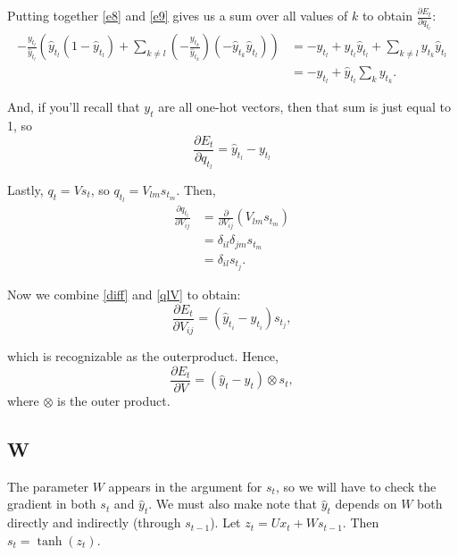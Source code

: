 \documentclass[11pt,twoside]{article}
\begin{document}
\noindent Putting together \eqref{e8} and \eqref{e9} gives us a sum over all values of $k$ to obtain $\frac{\partial E_t}{\partial q_{t_l}}$:
\begin{subequations}
\begin{align}
-\frac{y_{t_l}}{\hat{y}_{t_l}}\left(\hat{y}_{t_l}\left(1-\hat{y}_{t_l}\right)+\sum_{k\ne l}{}\left(-\frac{y_{t_k}}{\hat{y}_{t_k}}\right)\left(-\hat{y}_{t_k}\hat{y}_{t_l}\right)  \right)
&= -y_{t_l}+y_{t_l}\hat{y}_{t_l}+\sum_{k\ne l}{}y_{t_k}\hat{y}_{t_l} \\
&= -y_{t_l} + \hat{y}_{t_l}\sum_{k}{}y_{t_k}.
\end{align}
\end{subequations}

\noindent And, if you'll recall that $y_t$ are all one-hot vectors, then that sum is just equal to 1, so
\begin{equation}
\label{diff}
\frac{\partial E_t}{\partial q_{t_l}}=\hat{y}_{t_l}-y_{t_l}
\end{equation}


\noindent Lastly, $q_t=V s_t$, so $q_{t_l}=V_{l m}s_{t_m}$. Then,
\begin{subequations}
\begin{align}
\frac{\partial q_{t_l}}{\partial V_{i j}} &= \frac{\partial }{\partial V_{i j}}\left(V_{l m} s_{t_m}\right) \\
	&= \delta_{i l}\delta_{j m}s_{t_m} \\
\label{qlV}
	&= \delta_{i l}s_{t_j}.
\end{align}
\end{subequations}

\noindent Now we combine \eqref{diff} and \eqref{qlV} to obtain:
\begin{equation}
\frac{\partial E_t}{\partial V_{i j}}=\left(\hat{y}_{t_i}-y_{t_i}\right) s_{t_j},
\end{equation}

\noindent which is recognizable as the outerproduct. Hence,
\begin{equation}
\frac{\partial E_t}{\partial V}=\left(\hat{y}_t-y_t\right) \otimes s_t,
\end{equation}
\noindent where $\otimes$ is the outer product.

\subsection{W}
The parameter $W$ appears in the argument for $s_t$, so we will have to check the gradient in both $s_t$ and $\hat{y}_t$. We must also make note that $\hat{y}_t$ depends on $W$ both directly and indirectly (through $s_{t-1}$). Let $z_t=Ux_t+Ws_{t-1}$. Then $s_t=\tanh(z_t)$.
\end{document}
